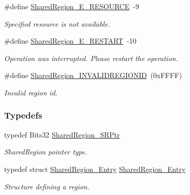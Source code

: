 \begin{DoxyCompactItemize}
\#define \hyperlink{_shared_region_8h_aae63a683d1705eed55bb537a55b4bb20}{Shared\-Region\-\_\-\-E\-\_\-\-R\-E\-S\-O\-U\-R\-C\-E}~-\/9
\begin{DoxyCompactList}\small\item\em Specified resource is not available. \end{DoxyCompactList}\item 
\#define \hyperlink{_shared_region_8h_a55086f20c7279ee538a1325fe5a60b9d}{Shared\-Region\-\_\-\-E\-\_\-\-R\-E\-S\-T\-A\-R\-T}~-\/10
\begin{DoxyCompactList}\small\item\em Operation was interrupted. Please restart the operation. \end{DoxyCompactList}\item 
\#define \hyperlink{_shared_region_8h_a8212f0ca02e94eb45edad350147db529}{Shared\-Region\-\_\-\-I\-N\-V\-A\-L\-I\-D\-R\-E\-G\-I\-O\-N\-I\-D}~(0x\-F\-F\-F\-F)
\begin{DoxyCompactList}\small\item\em Invalid region id. \end{DoxyCompactList}\end{DoxyCompactItemize}
\subsubsection*{Typedefs}
\begin{DoxyCompactItemize}
\item 
typedef Bits32 \hyperlink{_shared_region_8h_a3efe06da0fa1fcbb3b271278ddd9b410}{Shared\-Region\-\_\-\-S\-R\-Ptr}
\begin{DoxyCompactList}\small\item\em Shared\-Region pointer type. \end{DoxyCompactList}\item 
typedef struct \hyperlink{struct_shared_region___entry}{Shared\-Region\-\_\-\-Entry} \hyperlink{_shared_region_8h_aadc9f7e3da237ebfbefeb2edfc87732d}{Shared\-Region\-\_\-\-Entry}
\begin{DoxyCompactList}\small\item\em Structure defining a region. \end{DoxyCompactList}\end{DoxyCompactItemize}
